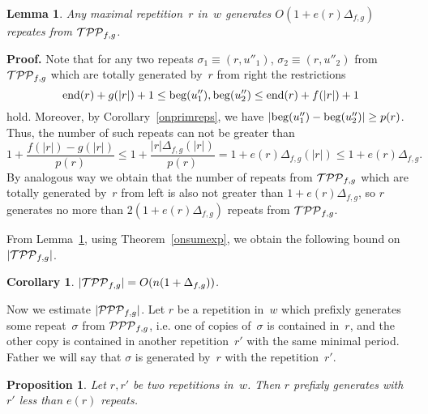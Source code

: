 \documentclass{article}
\newtheorem{proposition}{Proposition}
\newtheorem{corollary}{Corollary}
\newtheorem{lemma}{Lemma}
\begin{document}
\begin{lemma} 
Any maximal repetition~$r$ in~$w$ generates $O(1+e(r)\Delta_{f, g})$
repeates from ${\cal TPP}_{f,g}$.
\label{genTPP}
\end{lemma} 

{\bf Proof.} 
Note that for any two repeats $\sigma_1\equiv (r, u''_1)$, $\sigma_2\equiv (r, u''_2)$
from ${\cal TPP}_{f,g}$ which are totally generated by~$r$ from right the restrictions
$$
{\rm end} (r)+g(|r|)+1\le {\rm beg} (u''_1), {\rm beg} (u''_2)\le {\rm end} (r)+f(|r|)+1
$$
hold. Moreover, by Corollary~\ref{onprimreps}, we have $|{\rm beg} (u''_1)-{\rm beg} (u''_2)|\ge p(r)$.
Thus, the number of such repeats can not be greater than 
$$
1+\frac{f(|r|)-g(|r|)}{p(r)}\le 1+\frac{|r|\Delta_{f, g}(|r|)}{p(r)}=1+e(r)\Delta_{f, g}(|r|)\le 1+e(r)\Delta_{f, g}.
$$
By analogous way we obtain that the number of repeats from ${\cal TPP}_{f,g}$ which are 
totally generated by~$r$ from left is also not greater than $1+e(r)\Delta_{f, g}$, so
$r$ generates no more than $2(1+e(r)\Delta_{f, g})$ repeats from ${\cal TPP}_{f,g}$.

From Lemma~\ref{genTPP}, using Theorem~\ref{onsumexp}, we obtain the following
bound on $|{\cal TPP}_{f,g}|$.

\begin{corollary}
$|{\cal TPP}_{f,g}|=O(n(1+\Delta_{f, g}))$.
\label{onTPP}
\end{corollary}

Now we estimate $|{\cal PPP}_{f,g}|$. Let $r$ be a repetition in~$w$ which
prefixly generates some repeat~$\sigma$ from ${\cal PPP}_{f,g}$, i.e. one
of copies of~$\sigma$ is contained in~$r$, and the other copy is contained 
in another repetition~$r'$ with the same minimal period. Father we will say
that $\sigma$ is generated by~$r$ with the repetition~$r'$.

\begin{proposition}
Let $r, r'$ be two repetitions in~$w$. Then $r$ prefixly generates with~$r'$
less than $e(r)$ repeats.
\label{proponpref}
\end{proposition}
\end{document}
